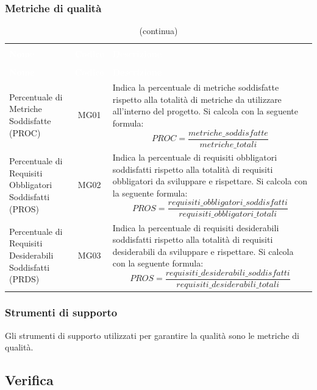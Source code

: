 \subsubsection{Metriche di qualità} \label{par:metricheGen}
\begin{longtable}{ C{4.5cm} c L{9.5cm} }
	\caption{Metriche per la qualità generale del prodotto}\\
		\textcolor{white}{\textbf{Nome}} & \textcolor{white}{\textbf{Codice}} & \centerline{\textcolor{white}{\textbf{Descrizione}}} \\
		\endfirsthead
		\caption[]{(continua)} \\
		\textcolor{white}{\textbf{Nome}} & \textcolor{white}{\textbf{Codice}} & \centerline{\textcolor{white}{\textbf{Descrizione}}} \\
		\endhead
	 Percentuale di Metriche Soddisfatte (PROC) & MG01 & Indica la percentuale di metriche soddisfatte rispetto alla totalità di metriche da utilizzare all’interno del progetto. Si calcola con la seguente formula:
		\[ PROC = \frac{metriche\_soddisfatte}{metriche\_totali} \] \\
	Percentuale di Requisiti Obbligatori Soddisfatti (PROS) & MG02 & Indica la percentuale di requisiti obbligatori soddisfatti rispetto alla totalità di requisiti obbligatori da sviluppare e rispettare. Si calcola con la seguente formula:
		\[ PROS = \frac{requisiti\_obbligatori\_soddisfatti}{requisiti\_obbligatori\_totali} \] \\
			Percentuale di Requisiti Desiderabili Soddisfatti (PRDS) & MG03 & Indica la percentuale di requisiti desiderabili soddisfatti rispetto alla totalità di requisiti desiderabili da sviluppare e rispettare. Si calcola con la seguente formula:
		\[ PROS = \frac{requisiti\_desiderabili\_soddisfatti}{requisiti\_desiderabili\_totali} \] \\
\end{longtable}

\subsubsection{Strumenti di supporto}
Gli strumenti di supporto utilizzati per garantire la qualità sono le metriche di qualità.

\subsection{Verifica}
